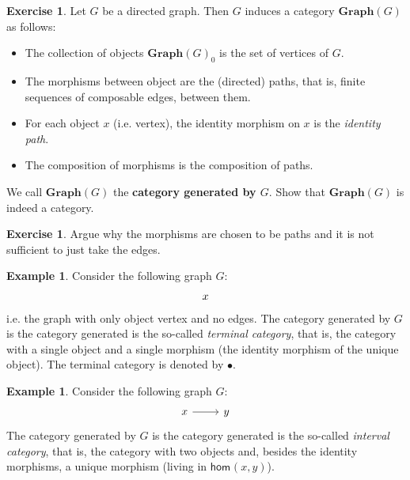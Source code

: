 \documentclass[a4paper,11pt, oneside,titlepage=false]{scrbook}
\theoremstyle{plain}
\theoremstyle{definition}
\newtheorem{exa}[thm]{Example}
\newtheorem{exer}[thm]{Exercise}
\newcommand{\cfont}[1]{\ensuremath{\mathsf{#1}}}
\newcommand{\Ob}[1]{{#1}_0}
\newcommand{\Hom}[3][]{\cfont{hom}_{#1}(#2,#3)}
\begin{document}
\begin{exer} Let $G$ be a directed graph. Then $G$ induces a category $\mathbf{Graph}(G)$ as follows:
\begin{itemize}
\item The collection of objects $\Ob{\mathbf{Graph}(G)}$ is the set of vertices of $G$. 
\item The morphisms between object are the (directed) paths, that is, finite sequences of composable edges, between them.
\item For each object $x$ (i.e. vertex), the identity morphism on $x$ is the \textit{identity path}.
\item The composition of morphisms is the composition of paths.
\end{itemize}
We call $\mathbf{Graph}(G)$ the \textbf{category generated by $G$}. Show that $\mathbf{Graph}(G)$ is indeed a category.
\end{exer}

\begin{exer} Argue why the morphisms are chosen to be paths and it is not sufficient to just take the edges. 
\end{exer}

\begin{exa}\label{exa:graph_terminalcat} Consider the following graph $G$:
\[
\begin{tikzcd}
x
\end{tikzcd}
\]
i.e. the graph with only object vertex and no edges. The category generated by $G$ is the category generated is the so-called \textit{terminal category}, that is, the category with a single object and a single morphism (the identity morphism of the unique object). 
The terminal category is denoted by $\bullet$.
\end{exa}

\begin{exa}\label{exa:graph_intervalcat} Consider the following graph $G$:
\[
\begin{tikzcd}
x \arrow[r] & y
\end{tikzcd}
\]
The category generated by $G$ is the category generated is the so-called \textit{interval category}, that is, the category with two objects and, besides the identity morphisms, a unique morphism (living in $\Hom{x}{y}$).
\end{exa}
\end{document}
